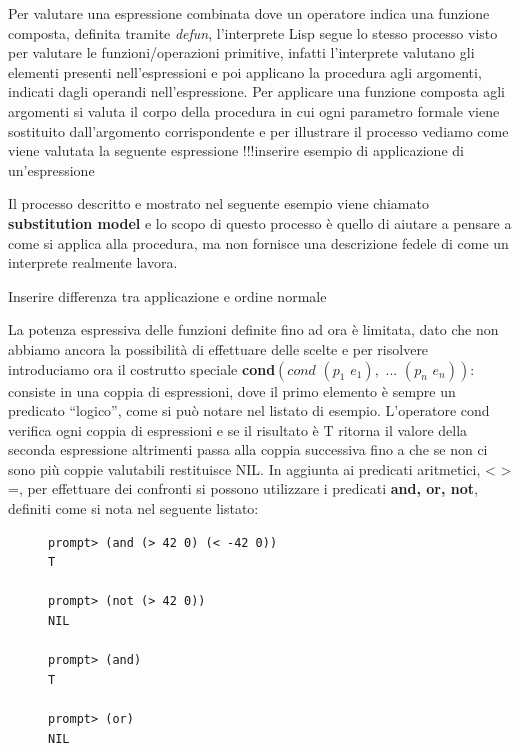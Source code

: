 \documentclass[a4paper]{book}
\begin{document}
Per valutare una espressione combinata dove un operatore indica una funzione composta, definita tramite \emph{defun}, l'interprete Lisp segue
lo stesso processo visto per valutare le funzioni/operazioni primitive, infatti l'interprete valutano gli elementi presenti nell'espressioni
e poi applicano la procedura agli argomenti, indicati dagli operandi nell'espressione.\newline
Per applicare una funzione composta agli argomenti si valuta il corpo della procedura in cui ogni parametro formale
viene sostituito dall'argomento corrispondente e per illustrare il processo vediamo come viene valutata la seguente espressione
!!!inserire esempio di applicazione di un'espressione

Il processo descritto e mostrato nel seguente esempio viene chiamato \textbf{substitution model} e lo scopo di questo processo è quello
di aiutare a pensare a come si applica alla procedura, ma non fornisce una descrizione fedele di come un interprete realmente lavora.

Inserire differenza tra applicazione e ordine normale


La potenza espressiva delle funzioni definite fino ad ora è limitata, dato che non abbiamo ancora la possibilità di effettuare delle scelte
e per risolvere introduciamo ora il costrutto speciale \textbf{cond}$(cond\,\,(p_1\,\,e_1),\,\,...\,\,(p_n\,\,e_n))$:
consiste in una coppia di espressioni, dove il primo elemento è sempre un predicato ``logico'', come si può notare nel listato di esempio.\newline
L'operatore cond verifica ogni coppia di espressioni e se il risultato è T ritorna il valore della seconda espressione altrimenti
passa alla coppia successiva fino a che se non ci sono più coppie valutabili restituisce NIL.\newline
In aggiunta ai predicati aritmetici, < > =, per effettuare dei confronti si possono utilizzare i predicati \textbf{and, or, not},
definiti come si nota nel seguente listato:
\begin{figure}
\begin{verbatim}
prompt> (and (> 42 0) (< -42 0))
T

prompt> (not (> 42 0))
NIL

prompt> (and)
T

prompt> (or)
NIL
\end{verbatim}
\end{figure}
\end{document}
